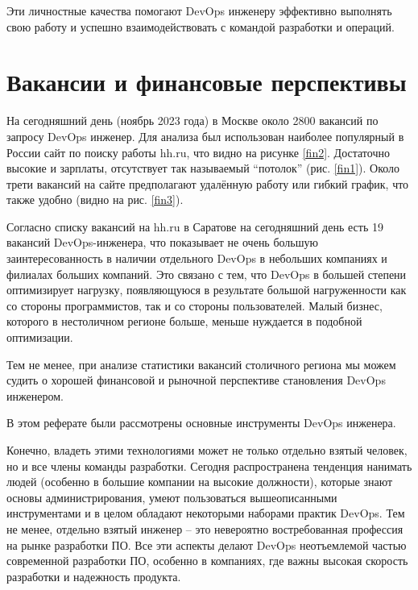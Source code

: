 \documentclass[referat]{SCWorks}
\begin{document}
Эти личностные качества помогают DevOps инженеру эффективно выполнять свою работу и успешно взаимодействовать с командой разработки и операций.

\section{Вакансии и финансовые перспективы}

На сегодняшний день (ноябрь 2023 года) в Москве около 2800 вакансий по запросу DevOps инженер. Для анализа был использован наиболее популярный в России сайт по поиску работы hh.ru, что видно на рисунке \ref{fin2}. Достаточно высокие и зарплаты, отсутствует так называемый ``потолок'' (рис. \ref{fin1}). Около трети вакансий на сайте предполагают удалённую работу или гибкий график, что также удобно (видно на рис. \ref{fin3}).

Согласно списку вакансий на hh.ru в Саратове на сегодняшний день есть 19 вакансий DevOps-инженера, что показывает не очень большую заинтересованность в наличии отдельного DevOps в небольших компаниях и филиалах больших компаний. Это связано с тем, что DevOps в большей степени оптимизирует нагрузку, появляющуюся в результате большой нагруженности как со стороны программистов, так и со стороны пользователей. Малый бизнес, которого в нестоличном регионе больше, меньше нуждается в подобной оптимизации.

Тем не менее, при анализе статистики вакансий столичного региона мы можем судить о хорошей финансовой и рыночной перспективе становления DevOps инженером.


\conclusion

В этом реферате были рассмотрены основные инструменты DevOps инженера. 

Конечно, владеть этими технологиями может не только отдельно взятый человек, но и все члены команды разработки. Сегодня распространена тенденция нанимать людей (особенно в большие компании на высокие должности), которые знают основы администрирования, умеют пользоваться вышеописанными инструментами и в целом обладают некоторыми наборами практик DevOps. Тем не менее, отдельно взятый инженер -- это невероятно востребованная профессия на рынке разработки ПО.
Все эти аспекты делают DevOps неотъемлемой частью современной разработки ПО, особенно в компаниях, где важны высокая скорость разработки и надежность продукта.

%
\end{document}
